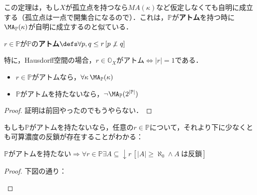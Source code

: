 \documentclass[a4j]{bxjsarticle}
\theoremstyle{definition}
\begin{document}
この定理は，もし$X$が孤立点を持つなら$MA(\kappa)$など仮定しなくても自明に成立する（孤立点は一点で開集合になるので）．これは，$\mathbb{P}$が\textbf{アトム}を持つ時に$\MA_{\mathbb{P}}(\kappa)$が自明に成立するのと似ている．
\begin{definition}
 $r \in \mathbb{P}$が$\mathbb{P}$の\textbf{アトム}$\defs \forall p, q \leq r \, [p \not \perp q]$
\end{definition}

特に，Hausdorff空間の場合，$r\in \mathbb{O}_X$がアトム$\Leftrightarrow |r| = 1$である．

\begin{lemma}
 \begin{itemize}
  \item $r \in \mathbb{P}$がアトムなら，$\forall \kappa \, \MA_{\mathbb{P}}(\kappa)$
  \item $\mathbb{P}$がアトムを持たないなら，$\neg \MA_{\mathbb{P}}(2^{|\mathbb{P}|})$
 \end{itemize}
\end{lemma}
\begin{proof}
 証明は前回やったのでもうやらない．\mbox{}
\end{proof}

もしも$\mathbb{P}$がアトムを持たないなら，任意の$r \in \mathbb{P}$について，それより下に少なくとも可算濃度の反鎖が存在することがわかる：

\begin{lemma}
 $\mathbb{P}$がアトムを持たない$ \Rightarrow \forall r \in \mathbb{P} \exists A \subseteq \mathop{\downarrow} r \, [|A| \geq \aleph_0 \wedge A\ \text{は反鎖}]$
\end{lemma}
\begin{proof}
 下図の通り：
 \begin{center}
 \end{center}
\end{proof}
\end{document}
